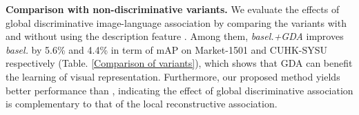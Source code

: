 \documentclass[runningheads]{llncs}
\begin{document}
 \noindent \textbf{Comparison with non-discriminative variants.} We evaluate the effects of global discriminative image-language association by comparing the variants with and without using the description feature .  Among them, \emph{basel.+GDA} improves \emph{basel.} by 5.6\% and 4.4\% in term of mAP on Market-1501 and CUHK-SYSU respectively (Table. \ref{Comparison of variants}), which shows that GDA can benefit the learning of visual representation. Furthermore, our proposed method  yields better performance than , indicating the effect of global discriminative association is complementary to that of the local reconstructive association. 
 
 
 \begin{table}[b] \vspace{-1em}
\setlength{\tabcolsep}{6pt}
 \begin{center}
 \end{center}
 \caption{ Importance analysis of  in  \emph{basel.+GDA}. We fix  and adjust  over 0, 0.05, 0.1, 0.5, 1.  Top-1,-5,-10 accuracies (\%) and mAP(\%) are reported.} \label{Comparison of parameters}
\end{table} 
\end{document}
